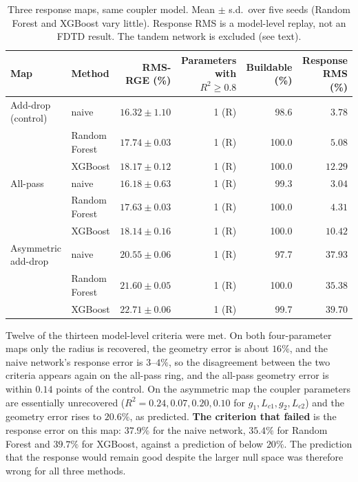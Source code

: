 \documentclass[11pt]{article}
\begin{document}
\begin{table}[!tbp]
\centering
\caption{Three response maps, same coupler model. Mean $\pm$ s.d.\ over five seeds (Random Forest and XGBoost vary little). Response RMS is a model-level replay, not an FDTD result. The tandem network is excluded (see text).}
\label{tab:gen}
\small
\begin{tabular}{@{}llrrrr@{}}
\toprule
Map & Method & RMS-RGE (\%) & Parameters with $R^2\ge0.8$ & Buildable (\%) & Response RMS (\%) \\
\midrule
Add-drop (control) & naive & $16.32 \pm 1.10$ & 1 (R) & 98.6 & $3.78$ \\
 & Random Forest & $17.74 \pm 0.03$ & 1 (R) & 100.0 & $5.08$ \\
 & XGBoost & $18.17 \pm 0.12$ & 1 (R) & 100.0 & $12.29$ \\
All-pass & naive & $16.18 \pm 0.63$ & 1 (R) & 99.3 & $3.04$ \\
 & Random Forest & $17.63 \pm 0.03$ & 1 (R) & 100.0 & $4.31$ \\
 & XGBoost & $18.14 \pm 0.16$ & 1 (R) & 100.0 & $10.42$ \\
Asymmetric add-drop & naive & $20.55 \pm 0.06$ & 1 (R) & 97.7 & $37.93$ \\
 & Random Forest & $21.60 \pm 0.05$ & 1 (R) & 100.0 & $35.38$ \\
 & XGBoost & $22.71 \pm 0.06$ & 1 (R) & 99.7 & $39.70$ \\
\bottomrule
\end{tabular}
\end{table}

Twelve of the thirteen model-level criteria were met. On both four-parameter maps only the radius is recovered, the geometry error is about $16\%$, and the naive network's response error is $3$--$4\%$, so the disagreement between the two criteria appears again on the all-pass ring, and the all-pass geometry error is within $0.14$ points of the control. On the asymmetric map the coupler parameters are essentially unrecovered ($R^2 = 0.24, 0.07, 0.20, 0.10$ for $g_1, L_{c1}, g_2, L_{c2}$) and the geometry error rises to $20.6\%$, as predicted. \textbf{The criterion that failed} is the response error on this map: $37.9\%$ for the naive network, $35.4\%$ for Random Forest and $39.7\%$ for XGBoost, against a prediction of below $20\%$. The prediction that the response would remain good despite the larger null space was therefore wrong for all three methods.
\end{document}
